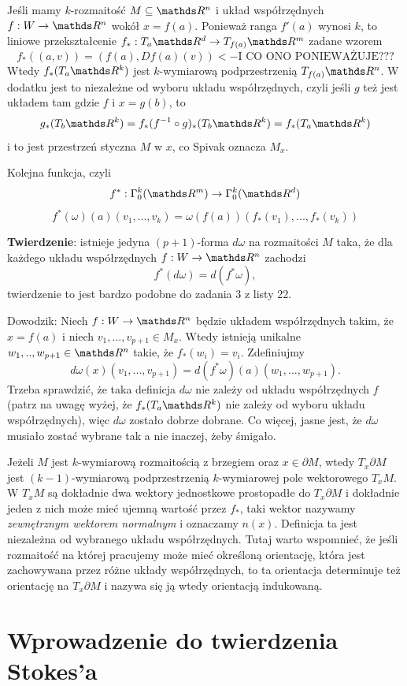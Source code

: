\documentclass{article}
\begin{document}
Jeśli mamy $k$-rozmaitość $M\subseteq\R^n$ i układ współrzędnych $f:W\to\R^n$ wokół $x=f(a)$. Ponieważ ranga $f'(a)$ wynosi $k$, to liniowe przekształcenie $f_*:T_a\R^d\to T_{f(a)}\R^m$ zadane wzorem
$$f_*((a,v))=(f(a), Df(a)(v)) <- \text{I CO ONO PONIEWAŻUJE???}$$
Wtedy $f_*(T_a\R^k)$ jest $k$-wymiarową podprzestrzenią $T_{f(a)}\R^n$. W dodatku jest to niezależne od wyboru układu współrzędnych, czyli jeśli $g$ też jest układem tam gdzie $f$ i $x=g(b)$, to 
$$g_*(T_b\R^k)=f_*(f^{-1}\circ g)_*(T_b\R^k)=f_*(T_a\R^k)$$
i to jest przestrzeń styczna $M$ w $x$, co Spivak oznacza $M_x$.
\smallskip

Kolejna funkcja, czyli 
$$f^*:\Gamma^k_0(\R^m)\to\Gamma_0^k(\R^d)$$
$$f^*(\omega)(a)(v_1,...,v_k)=\omega(f(a))(f_*(v_1),...,f_*(v_k))$$

\textbf{\large\color{acc}Twierdzenie}: istnieje jedyna $(p+1)$-forma $d\omega$ na rozmaitości $M$ taka, że dla każdego układu współrzędnych $f:W\to \R^n$ zachodzi
$$f^*(d\omega)=d(f^*\omega),$$
twierdzenie to jest bardzo podobne do zadania 3 z listy 22.

{\color{acc}Dowodzik:} Niech $f:W\to\R^n$ będzie układem współrzędnych takim, że $x=f(a)$ i niech $v_1,...,v_{p+1}\in M_x$. Wtedy istnieją unikalne $w_1,..,w_{{p+1}}\in\R^n$ takie, że $f_*(w_i)=v_i$. Zdefiniujmy 
$$d\omega(x)(v_1,...,v_{p+1})=d(f^*\omega)(a)(w_1,...,w_{p+1}).$$
Trzeba sprawdzić, że taka definicja $d\omega$ nie zależy od układu współrzędnych $f$ (patrz na uwagę wyżej, że $f_*(T_a\R^k)$ nie zależy od wyboru układu współrzędnych), więc $d\omega$ zostało dobrze dobrane. Co więcej, jasne jest, że $d\omega$ musiało zostać wybrane tak a nie inaczej, żeby śmigało.
\bigskip

Jeżeli $M$ jest $k$-wymiarową rozmaitością z brzegiem oraz $x\in \partial M$, wtedy $T_x\partial M$ jest $(k-1)$-wymiarową podprzestrzenią $k$-wymiarowej pole wektorowego $T_xM$. W $T_xM$ są dokładnie dwa wektory jednostkowe prostopadłe do $T_x\partial M$ i dokładnie jeden z nich może mieć ujemną wartość przez $f_*$, taki wektor nazywamy \emph{zewnętrznym wektorem normalnym} i oznaczamy $n(x)$. Definicja ta jest niezależna od wybranego układu współrzędnych. Tutaj warto wspomnieć, że jeśli rozmaitość na której pracujemy może mieć określoną orientację, która jest zachowywana przez różne układy współrzędnych, to ta orientacja determinuje też orientację na $T_x\partial M$ i nazywa się ją wtedy orientacją indukowaną.

\section{Wprowadzenie do twierdzenia Stokes'a}
\end{document}
